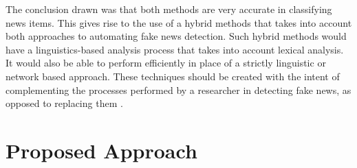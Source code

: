 \documentclass[11pt,a4paper]{article}
\begin{document}
The conclusion drawn was that both methods are very accurate in classifying news items. This gives rise to the use of a hybrid methods that takes into account both approaches to automating fake news detection. Such hybrid methods would have a linguistics-based analysis process that takes into account lexical analysis. It would also be able to perform efficiently in place of a strictly linguistic or network based approach. These techniques should be created with the intent of complementing the processes performed by a researcher in detecting fake news, as opposed to replacing them \cite{conroy2015automatic}. \\



\section{Proposed Approach}






%
%


\end{document}
